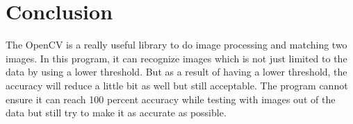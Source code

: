 \documentclass[12pt, oneside]{report}
\begin{document}
	\section{Conclusion}
		The OpenCV is a really useful library to do image processing and matching two images. In this program, it can recognize images which is not just limited to the data by using a lower threshold. But as a result of having a lower threshold, the accuracy will reduce a little bit as well but still acceptable. The program cannot ensure it can reach 100 percent accuracy while testing with images out of the data but still try to make it as accurate as possible.
	
\end{document}
